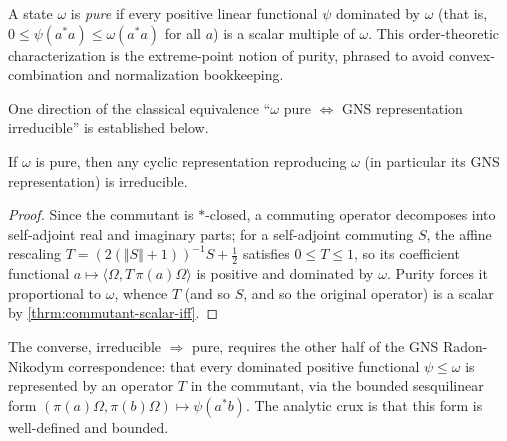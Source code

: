 \begin{definition}
    \label{def:pure-state}
    \leanok
    A state $\omega$ is \emph{pure} if every positive linear functional $\psi$ dominated by $\omega$ (that is, $0 \le \psi(a^*a) \le \omega(a^*a)$ for all $a$) is a scalar multiple of $\omega$. This order-theoretic characterization is the extreme-point notion of purity, phrased to avoid convex-combination and normalization bookkeeping.
\end{definition}

One direction of the classical equivalence ``$\omega$ pure $\iff$ GNS representation irreducible'' is established below.

\begin{theorem}
    \label{thrm:pure-implies-irreducible}
    \leanok
    If $\omega$ is pure, then any cyclic representation reproducing $\omega$ (in particular its GNS representation) is irreducible.
\end{theorem}
\begin{proof}
    \leanok
    Since the commutant is $*$-closed, a commuting operator decomposes into self-adjoint real and imaginary parts; for a self-adjoint commuting $S$, the affine rescaling $T = (2(\Vert S\Vert+1))^{-1} S + \tfrac12$ satisfies $0 \le T \le 1$, so its coefficient functional $a \mapsto \langle \Omega, T\,\pi(a)\Omega\rangle$ is positive and dominated by $\omega$. Purity forces it proportional to $\omega$, whence $T$ (and so $S$, and so the original operator) is a scalar by \ref{thrm:commutant-scalar-iff}.
\end{proof}

The converse, irreducible $\Rightarrow$ pure, requires the other half of the GNS Radon-Nikodym correspondence: that every dominated positive functional $\psi \le \omega$ is represented by an operator $T$ in the commutant, via the bounded sesquilinear form $(\pi(a)\Omega, \pi(b)\Omega) \mapsto \psi(a^* b)$. The analytic crux is that this form is well-defined and bounded.

